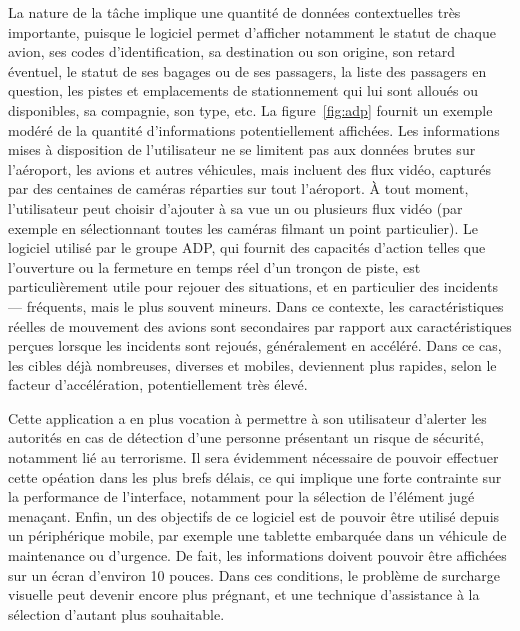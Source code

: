 	La nature de la tâche implique une quantité de données contextuelles très importante, puisque le logiciel permet d'afficher notamment le statut de chaque avion, ses codes d'identification, sa destination ou son origine, son retard éventuel, le statut de ses bagages ou de ses passagers, la liste des passagers en question, les pistes et emplacements de stationnement qui lui sont alloués ou disponibles, sa compagnie, son type, etc. La figure~\ref{fig:adp} fournit un exemple modéré de la quantité d'informations potentiellement affichées. Les informations mises à disposition de l'utilisateur ne se limitent pas aux données brutes sur l'aéroport, les avions et autres véhicules, mais incluent des flux vidéo, capturés par des centaines de caméras réparties sur tout l'aéroport. À tout moment, l'utilisateur peut choisir d'ajouter à sa vue un ou plusieurs flux vidéo (par exemple en sélectionnant toutes les caméras filmant un point particulier). Le logiciel utilisé par le groupe ADP, qui fournit des capacités d'action telles que l'ouverture ou la fermeture en temps réel d'un tronçon de piste, est particulièrement utile pour rejouer des situations, et en particulier des incidents --- fréquents, mais le plus souvent mineurs. Dans ce contexte, les caractéristiques réelles de mouvement des avions sont secondaires par rapport aux caractéristiques perçues lorsque les incidents sont rejoués, généralement en accéléré. Dans ce cas, les cibles déjà nombreuses, diverses et mobiles, deviennent plus rapides, selon le facteur d'accélération, potentiellement très élevé.
	
	Cette application a en plus vocation à permettre à son utilisateur d'alerter les autorités en cas de détection d'une personne présentant un risque de sécurité, notamment lié au terrorisme. Il sera évidemment nécessaire de pouvoir effectuer cette opéation dans les plus brefs délais, ce qui implique une forte contrainte sur la performance de l'interface, notamment pour la sélection de l'élément jugé menaçant. Enfin, un des objectifs de ce logiciel est de pouvoir être utilisé depuis un périphérique mobile, par exemple une tablette embarquée dans un véhicule de maintenance ou d'urgence. De fait, les informations doivent pouvoir être affichées sur un écran d'environ 10 pouces. Dans ces conditions, le problème de surcharge visuelle peut devenir encore plus prégnant, et une technique d'assistance à la sélection d'autant plus souhaitable.

